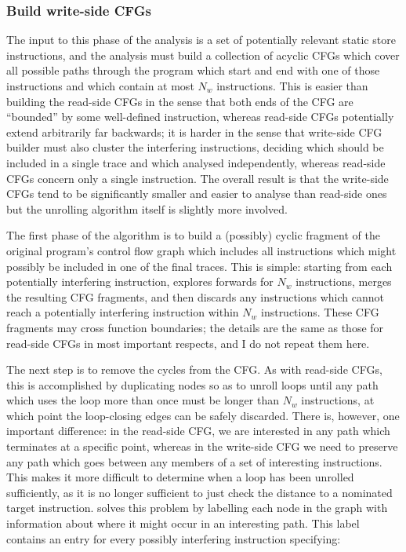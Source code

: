 \subsubsection{Build write-side CFGs}

The input to this phase of the analysis is a set of potentially
relevant static store instructions, and the
analysis must build a collection of acyclic CFGs which cover all
possible paths through the program which start and end with one of
those instructions and which contain at most $N_w$ instructions.  This
is easier than building the read-side CFGs in the sense that both ends
of the CFG are ``bounded'' by some well-defined instruction, whereas
read-side CFGs potentially extend arbitrarily far backwards; it is
harder in the sense that write-side CFG builder must also cluster the
interfering instructions, deciding which should be included in a
single trace and which analysed independently, whereas read-side CFGs
concern only a single instruction.  The overall result is that the
write-side CFGs tend to be significantly smaller and easier to analyse
than read-side ones but the unrolling algorithm itself is slightly
more involved.

The first phase of the algorithm is to build a (possibly) cyclic
fragment of the original program's control flow graph which includes
all instructions which might possibly be included in one of the final
traces.  This is simple: starting from each potentially interfering
instruction, {\technique} explores forwards for $N_w$ instructions,
merges the resulting CFG fragments, and then discards any instructions
which cannot reach a potentially interfering instruction within $N_w$
instructions.  These CFG fragments may cross function boundaries; the
details are the same as those for read-side CFGs in most important
respects, and I do not repeat them here.

The next step is to remove the cycles from the CFG.  As with read-side
CFGs, this is accomplished by duplicating nodes so as to unroll loops
until any path which uses the loop more than once must be longer than
$N_w$ instructions, at which point the loop-closing edges can be
safely discarded.  There is, however, one important difference: in the
read-side CFG, we are interested in any path which terminates at a
specific point, whereas in the write-side CFG we need to preserve any
path which goes between any members of a set of interesting
instructions.  This makes it more difficult to determine when a loop
has been unrolled sufficiently, as it is no longer sufficient to just
check the distance to a nominated target instruction.  {\Technique}
solves this problem by labelling each node in the graph with
information about where it might occur in an interesting path.  This
label contains an entry for every possibly interfering instruction
specifying:

